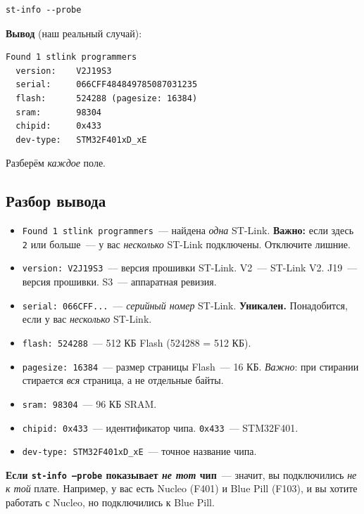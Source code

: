 \begin{verbatim}
st-info --probe
\end{verbatim}

\textbf{Вывод} (наш реальный случай):

\begin{verbatim}
Found 1 stlink programmers
  version:    V2J19S3
  serial:     066CFF484849785087031235
  flash:      524288 (pagesize: 16384)
  sram:       98304
  chipid:     0x433
  dev-type:   STM32F401xD_xE
\end{verbatim}

Разберём \emph{каждое} поле.

\subsection{Разбор вывода}

\begin{itemize}
    \item \texttt{Found 1 stlink programmers}~--- найдена
          \emph{одна} ST-Link. \textbf{Важно:} если здесь
          \texttt{2} или больше~--- у вас \emph{несколько}
          ST-Link подключены. Отключите лишние.
    \item \texttt{version: V2J19S3}~--- версия прошивки
          ST-Link. V2~--- ST-Link V2. J19~--- версия
          прошивки. S3~--- аппаратная ревизия.
    \item \texttt{serial: 066CFF...}~--- \emph{серийный
          номер} ST-Link. \textbf{Уникален.} Понадобится,
          если у вас \emph{несколько} ST-Link.
    \item \texttt{flash: 524288}~--- 512 КБ Flash
          (\SI{524288}{\byte} = 512 КБ).
    \item \texttt{pagesize: 16384}~--- размер страницы
          Flash~--- 16 КБ. \emph{Важно}: при стирании
          стирается \emph{вся} страница, а не отдельные
          байты.
    \item \texttt{sram: 98304}~--- 96 КБ SRAM.
    \item \texttt{chipid: 0x433}~--- идентификатор чипа.
          \texttt{0x433}~--- STM32F401.
    \item \texttt{dev-type: STM32F401xD\_xE}~--- точное
          название чипа.
\end{itemize}

\begin{keybox}
\textbf{Если \texttt{st-info --probe} показывает
\emph{не тот} чип}~--- значит, вы подключились
\emph{не к той} плате. Например, у вас есть Nucleo
(F401) и Blue Pill (F103), и вы хотите работать
с Nucleo, но подключились к Blue Pill.
\end{keybox}


